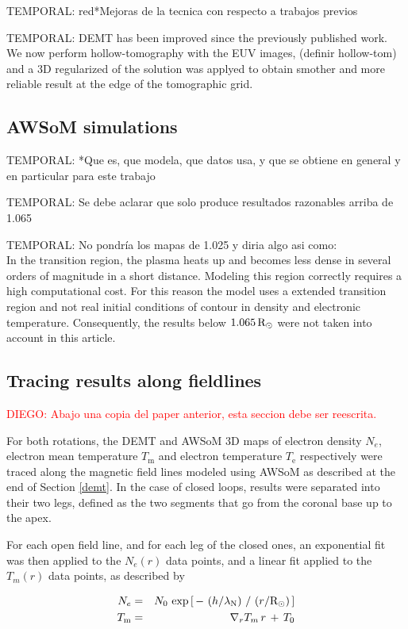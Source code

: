 \documentclass[namedreferences]{solarphysics}
\renewcommand{\l}{\lambda_{\rm N}}%
\newcommand{\mrsun}{{\rm R_\odot}}
\def\diego#1{\textcolor{red}{DIEGO: #1}}
\def\temp#1{\textcolor{mygray}{TEMPORAL: #1}}
\begin{document}
\begin{article}
\temp{red}{*Mejoras de la tecnica con respecto a trabajos previos}

\temp{DEMT has been improved since the previously published work. We now perform hollow-tomography with the EUV images, (definir hollow-tom) and a 3D regularized of the solution was applyed to obtain smother and more reliable result at the edge of the tomographic grid.}



\subsection{AWSoM simulations}\label{awsom} 
\temp{*Que es, que modela, que datos usa, y que se obtiene en general y en particular para este trabajo}

\temp{Se debe aclarar que solo produce resultados razonables arriba de 1.065}

\temp{No pondría los mapas de 1.025 y diria algo asi como:\\}
In the transition region, the plasma heats up and becomes less dense in several orders of magnitude in a short distance. Modeling this region correctly requires a high computational cost. For this reason the model uses a extended transition region and not real initial conditions of contour in density and electronic temperature. Consequently, the results below $1.065\,\mrsun$ were not taken into account in this article.

\subsection{Tracing results along fieldlines}\label{trace} 

\diego{Abajo una copia del paper anterior, esta seccion debe ser reescrita.}

For both rotations, the DEMT and AWSoM 3D maps of electron density $N_e$, electron mean temperature $T_\textrm{m}$ and electron temperature $T_\textrm{e}$ respectively were traced along the magnetic field lines modeled using AWSoM as described at the end of Section \ref{demt}. In the case of closed loops, results were separated into their two legs, defined as the two segments that go from the coronal base up to the apex.

For each open field line, and for each leg of the closed ones, an exponential fit was then applied to the $N_e(r)$ data points, and a linear fit applied to the $T_m(r)$ data points, as described by

\begin{eqnarray}\label{Nfit}
N_e &=& N_0\,\exp{\left[\,-\,\left(h/\l\right)\,/\,\left(r/\mrsun\right)\,\right]}\\
\label{Tfit}
T_\textrm{m} &=&  \nabla_r T_m \,r\,+\,T_\textrm{0}
\end{eqnarray}
 

\end{article}
\end{document}
